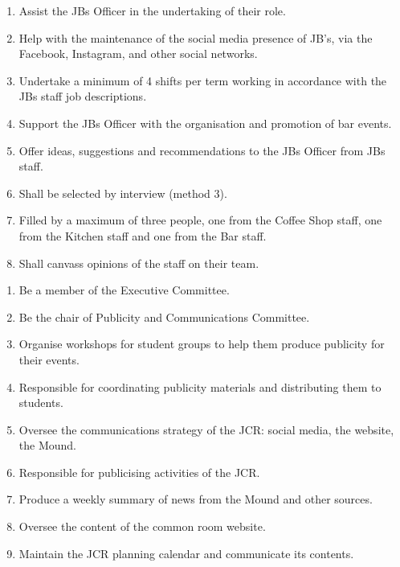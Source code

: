 \begin{enumerate}
    \item Assist the JBs Officer in the undertaking of their role. 
    \item Help with the maintenance of the social media presence of JB’s, via the Facebook, Instagram, and other social networks. 
    \item Undertake a minimum of 4 shifts per term working in accordance with the JBs staff job descriptions.
    \item Support the JBs Officer with the organisation and promotion of bar events.
    \item Offer ideas, suggestions and recommendations to the JBs Officer from JBs staff. 
    \item Shall be selected by interview (method 3).
    \item Filled by a maximum of three people, one from the Coffee Shop staff, one from the Kitchen staff and one from the Bar staff.
    \item Shall canvass opinions of the staff on their team.
\end{enumerate}

\begin{enumerate}
    \item Be a member of the Executive Committee.
    \item Be the chair of Publicity and Communications Committee.
    \item Organise workshops for student groups to help them produce publicity for their events.
    \item Responsible for coordinating publicity materials and distributing them to students.
    \item Oversee the communications strategy of the JCR: social media, the website, the Mound.
    \item Responsible for publicising activities of the JCR.
    \item Produce a weekly summary of news from the Mound and other sources.
    \item Oversee the content of the common room website.
    \item Maintain the JCR planning calendar and communicate its contents.
\end{enumerate}

